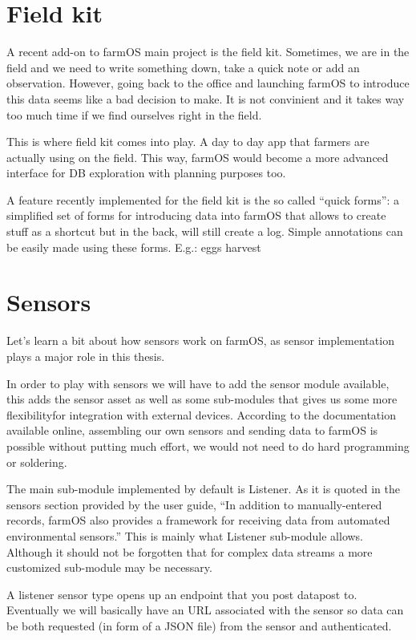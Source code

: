 \section{Field kit}
A recent add-on to farmOS main project is the field kit\cite{farmos-fieldkit}. Sometimes, we are in the field and we need to write something down, take a quick note or add an observation. However, going back to the office and launching farmOS to introduce this data seems like a bad decision to make. It is not convinient and it takes way too much time if we find ourselves right in the field.

This is where field kit comes into play. A day to day app that farmers are actually using on the field. This way, farmOS would become a more advanced interface for DB exploration with planning purposes too.

A feature recently implemented for the field kit is the so called ``quick forms'': a simplified set of forms for introducing data into farmOS that allows to create stuff as a shortcut but in the back, will still create a log. Simple annotations can be easily made using these forms. E.g.: eggs harvest

\section{Sensors}
Let's learn a bit about how sensors\cite{farmos-sensors} work on farmOS, as sensor implementation plays a major role in this thesis.

In order to play with sensors we will have to add the sensor module available, this adds the sensor asset as well as some sub-modules that gives us some more flexibilityfor integration with external devices. According to the documentation available online, assembling our own sensors and sending data to farmOS is possible without putting much effort, we would not need to do hard programming or soldering.

The main sub-module implemented by default is Listener. As it is quoted in the sensors section provided by the user guide, ``In addition to manually-entered records, farmOS also provides a framework for receiving data from automated environmental sensors.'' This is mainly what Listener sub-module allows. Although it should not be forgotten that for complex data streams a more customized sub-module may be necessary.

A listener sensor type opens up an endpoint that you post datapost to. Eventually we will basically have an URL associated with the sensor so data can be both requested (in form of a JSON file) from the sensor and authenticated.

